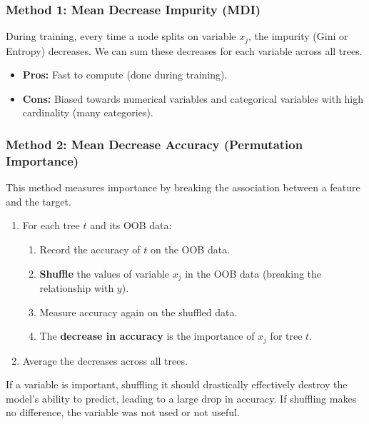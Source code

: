 \subsubsection*{Method 1: Mean Decrease Impurity (MDI)}
During training, every time a node splits on variable $x_j$, the impurity (Gini or Entropy) decreases. We can sum these decreases for each variable across all trees.
\begin{itemize}
    \item \textbf{Pros:} Fast to compute (done during training).
    \item \textbf{Cons:} Biased towards numerical variables and categorical variables with high cardinality (many categories).
\end{itemize}

\subsubsection*{Method 2: Mean Decrease Accuracy (Permutation Importance)}
This method measures importance by breaking the association between a feature and the target.

\begin{enumerate}
    \item For each tree $t$ and its OOB data:
    \begin{enumerate}
        \item Record the accuracy of $t$ on the OOB data.
        \item \textbf{Shuffle} the values of variable $x_j$ in the OOB data (breaking the relationship with $y$).
        \item Measure accuracy again on the shuffled data.
        \item The \textbf{decrease in accuracy} is the importance of $x_j$ for tree $t$.
    \end{enumerate}
    \item Average the decreases across all trees.
\end{enumerate}

\begin{tipsblock}[Rationale]
    If a variable is important, shuffling it should drastically effectively destroy the model's ability to predict, leading to a large drop in accuracy. If shuffling makes no difference, the variable was not used or not useful.
\end{tipsblock}

